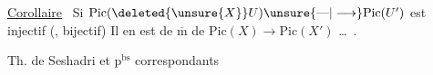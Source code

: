 \uline{Corollaire} \ Si $\mathrm{Pic}(\deleted{\unsure{X}}U)\unsure{\text{---}|\longrightarrow}\mathrm{Pic}(U')$ est injectif (, bijectif) Il en est de $\overline{\mathrm m}$ de $\mathrm{Pic}(X)\longrightarrow\mathrm{Pic}(X')$ \ldots\ .

Th. de Seshadri et p$^{\mathrm{bs}}$ correspondants


